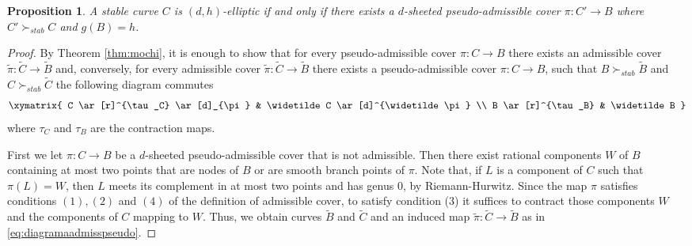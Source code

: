 \documentclass{article}
\newtheorem{proposition}[theorem]{Proposition}
\newcommand{\steq}{\succ_{stab}}
\renewcommand{\:}{\colon }
\begin{document}
\begin{proposition} \label{prop:equivpseudo}%
    A stable curve $C$ is $(d,h)$-elliptic if and only if there exists a $d$-sheeted pseudo-admissible cover $\pi: {C}'\rightarrow B$ where $C'\steq C$ and $g(B)= h$.
\end{proposition}
\begin{proof}
By Theorem \ref{thm:mochi},
it is enough to show that for every pseudo-admissible cover $\pi: C \rightarrow B$ there exists an admissible cover $\widetilde{\pi}:\widetilde{C} \rightarrow \widetilde{B}$
and, conversely, for every admissible cover $\widetilde{\pi}:\widetilde{C} \rightarrow \widetilde{B}$
there exists a pseudo-admissible cover $\pi: C \rightarrow B$, 
such that $B\steq \widetilde B$ and 
$C\steq \widetilde C$  the following diagram  commutes
\begin{equation}\label{eq:diagramaadmisspseudo}
\xymatrix{	
C \ar[r]^{\tau_C} \ar[d]_{\pi} 
& \widetilde C  \ar[d]^{\widetilde\pi} 
\\ B \ar[r]^{\tau_B} 
& \widetilde B }
\end{equation}
where $\tau_C$ and $\tau_B$ are the contraction maps.


First we let $\pi: C \rightarrow B$ be a $d$-sheeted pseudo-admissible cover that is not admissible. Then there exist rational components $W$ of $B$ containing at most two points that are nodes of $B$ or are smooth branch points of $\pi$. 
Note that, if $L$ is a component of $C$ such that $\pi(L)=W$, then 
$L$ meets its complement in at most two points and has genus 0, by Riemann-Hurwitz.
Since the map $\pi$ satisfies conditions $(1), (2)$ and $(4)$ of the definition of admissible cover, to satisfy condition (3) it suffices to contract those components $W$ and the components of $C$ mapping to $W$. 
Thus, we obtain curves  $\widetilde{B}$ and $\widetilde{C}$ and an
induced map $\widetilde{\pi}:\widetilde{C} \rightarrow \widetilde{B}$ as in \eqref{eq:diagramaadmisspseudo}.



\end{proof}
\end{document}
